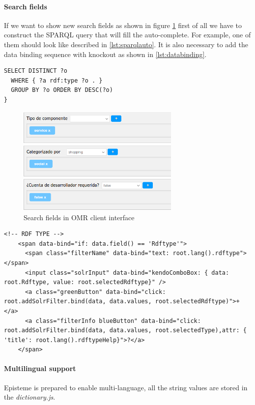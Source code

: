\paragraph{Search fields} If we want to show new search fields as shown in figure \ref{fig:searchfields} first of all we have to construct the SPARQL query that will fill the auto-complete. For example, one of them should look like described in \ref{lst:sparqlauto}. It is also necessary to add the data binding sequence with knockout as shown in \ref{lst:databinding}.

\newpage

\begin{lstlisting}[breaklines=true, style=consola, caption={SPARQL to retrieve all component types}, label={lst:sparqlauto}]
SELECT DISTINCT ?o  
  WHERE { ?a rdf:type ?o . } 
  GROUP BY ?o ORDER BY DESC(?o) 
}
\end{lstlisting}

\begin{figure}[h]
	\centering
	\includegraphics[width=300px]{graphics/searchfields.png}
	\caption{Search fields in OMR client interface}
	\label{fig:searchfields}
\end{figure}
\begin{lstlisting}[breaklines=true, style=listXML, caption={Data binding with knockout}, label={lst:databinding}]
<!-- RDF TYPE -->
    <span data-bind="if: data.field() == 'Rdftype'">
      <span class="filterName" data-bind="text: root.lang().rdftype"></span>
      <input class="solrInput" data-bind="kendoComboBox: { data: root.Rdftype, value: root.selectedRdftype}" />
      <a class="greenButton" data-bind="click: root.addSolrFilter.bind(data, data.values, root.selectedRdftype)">+</a>
      <a class="filterInfo blueButton" data-bind="click: root.addSolrFilter.bind(data, data.values, root.selectedType),attr: { 'title': root.lang().rdftypeHelp}">?</a>
    </span>
\end{lstlisting}
\paragraph{Multilingual support}Episteme is prepared to enable multi-language, all the string values are stored in the \textit{dictionary.js}.

